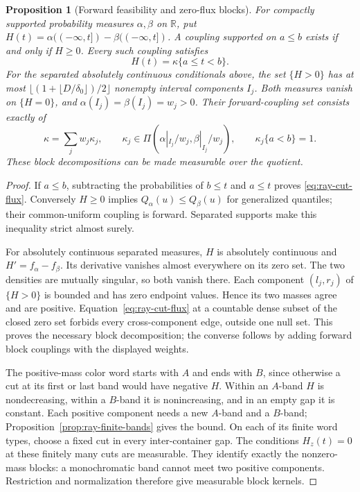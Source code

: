 \documentclass[11pt,reqno]{amsart}
\newtheorem{proposition}[theorem]{Proposition}
\theoremstyle{definition}
\theoremstyle{remark}
\numberwithin{equation}{section}
\newcommand{\R}{\mathbb R}
\begin{document}
\begin{proposition}[Forward feasibility and zero-flux blocks]
\label{prop:ray-forward-criterion}
For compactly supported probability measures \(\alpha,\beta\) on
\(\R\), put \(H(t)=\alpha(({-\infty},t])-\beta(({-\infty},t])\).
A coupling supported on \(a\le b\) exists if and only if \(H\ge0\).
Every such coupling satisfies
\begin{equation}
\label{eq:ray-cut-flux}
                         H(t)=\kappa\{a\le t<b\}.
\end{equation}
For the separated absolutely continuous conditionals above, the set
\(\{H>0\}\) has at most
\(\lfloor(1+\lfloor D/\delta_0\rfloor)/2\rfloor\) nonempty
interval components \(I_j\). Both measures vanish on \(\{H=0\}\),
and \(\alpha(I_j)=\beta(I_j)=w_j>0\). Their forward-coupling set
consists exactly of
\[
 \kappa=\sum_j w_j\kappa_j,\qquad
 \kappa_j\in\Pi(\alpha|_{I_j}/w_j,\beta|_{I_j}/w_j),\qquad
 \kappa_j\{a<b\}=1.
\]
These block decompositions can be made measurable over the quotient.
\end{proposition}
\begin{proof}
If \(a\le b\), subtracting the probabilities of \(b\le t\)
and \(a\le t\) proves \eqref{eq:ray-cut-flux}. Conversely \(H\ge0\)
implies \(Q_\alpha(u)\le Q_\beta(u)\) for generalized quantiles;
their common-uniform coupling is forward. Separated supports make
this inequality strict almost surely.

For absolutely continuous separated measures, \(H\) is absolutely
continuous and \(H'=f_\alpha-f_\beta\). Its derivative vanishes
almost everywhere on its zero set. The two densities are mutually
singular, so both vanish there. Each component \((l_j,r_j)\) of
\(\{H>0\}\) is bounded and has zero endpoint values. Hence its
two masses agree and are positive. Equation~\eqref{eq:ray-cut-flux}
at a countable dense subset of the closed zero set forbids every
cross-component edge, outside one null set. This proves the necessary
block decomposition; the converse follows by adding forward block
couplings with the displayed weights.

The positive-mass color word starts with \(A\) and ends with \(B\),
since otherwise a cut at its first or last band would have negative
\(H\). Within an \(A\)-band \(H\) is nondecreasing, within a
\(B\)-band it is nonincreasing, and in an empty gap it is constant.
Each positive component needs a new \(A\)-band and a \(B\)-band;
Proposition~\ref{prop:ray-finite-bands} gives the bound.
On each of its finite word types, choose a fixed cut in every
inter-container gap. The conditions \(H_z(t)=0\) at these finitely
many cuts are measurable. They identify exactly the nonzero-mass
blocks: a monochromatic band cannot meet two positive components.
Restriction and normalization therefore give measurable block kernels.
\end{proof}
\end{document}
